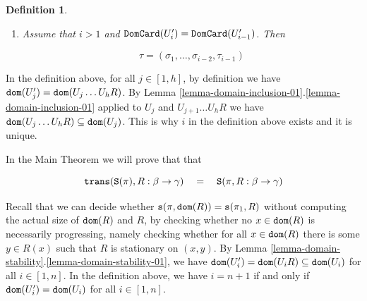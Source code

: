 \documentclass{lmcs}
\newtheorem{definition}[theorem]{Definition}
\begin{document}
\begin{definition}
\begin{enumerate}

\item
\emph{Assume that $i>1$ and ${\tt DomCard}(U'_i) = {\tt DomCard}(U'_{i-1})$}.
Then 

$$
\tau 
= 
(\sigma_1, \ldots, \sigma_{i-2}, \tau_{i-1})
$$

%
%
%
%
% 
\end{enumerate}
\end{definition}
 
In the definition above, for all $j \in [1,h]$, by definition we have 
${\tt dom}(U'_j) = {\tt dom}(U_j \ldots U_h R)$. 
By Lemma \ref{lemma-domain-inclusion-01}.\ref{lemma-domain-inclusion-01}
applied to $U_j$ and $U_{j+1} \ldots U_h R$ we have
${\tt dom}(U_j \ldots U_h R)  \subseteq {\tt dom}(U_j)$. 
This is why $i$ in the definition above exists and it is unique.

In the Main Theorem we will prove that that 

$$
\trans(\state(\pi),R:\beta \rightarrow \gamma) 
\ \ \ = \ \ \ 
\state(\pi,R:\beta \rightarrow \gamma)
$$



Recall that we can decide whether ${\tt s}(\pi,{\tt dom}(R)) = {\tt s}(\pi_1,R)$ without computing the
actual size of ${\tt dom}(R)$ and $R$, by checking whether
no $x \in {\tt dom}(R)$ is necessarily progressing, namely checking whether
for all $x \in {\tt dom}(R)$ there is some $y \in R(x)$ such that $R$ is stationary on $(x,y)$.
By Lemma \ref{lemma-domain-stability}.\ref{lemma-domain-stability-01}, 
we have ${\tt dom}(U'_i) = {\tt dom}(U_i R) \subseteq {\tt dom}(U_i)$ for all $i \in [1,n]$. 
In the definition above, we have $i=n+1$ if and only if ${\tt dom}(U'_i) = {\tt dom}(U_i)$
for all $i \in [1,n]$. 
\end{document}
